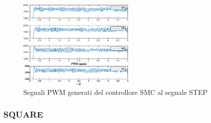 \begin{figure}
	\centering
	\includegraphics[width=0.5\textwidth]{Simulazioni/Figure/SMC/STEP/PWM}
	\caption{Segnali PWM generati del controllore SMC al segnale STEP}
\end{figure}

\subsubsection{SQUARE}
